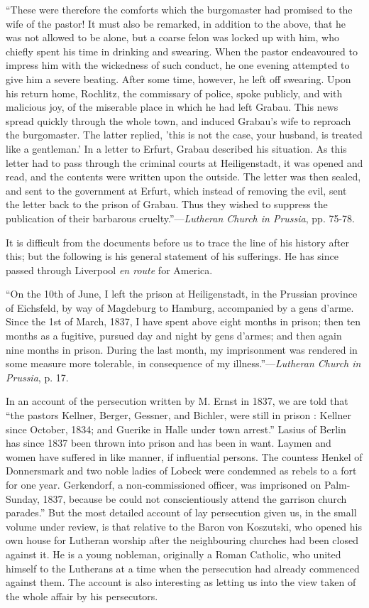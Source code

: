 ``These were therefore the comforts
which the burgomaster had promised to the wife of the pastor! It must
also be remarked, in addition to the above, that he was not allowed to
be alone, but a coarse felon was locked up with him, who chiefly spent
his time in drinking and swearing. When the pastor endeavoured to
impress him with the wickedness of such conduct, he one evening
attempted to give him a severe beating. After some time, however, he
left off swearing. Upon his return home, Rochlitz, the commissary of
police, spoke publicly, and with malicious joy, of the miserable place
in which he had left Grabau. This news spread quickly through the whole
town, and induced Grabau's wife to reproach the burgomaster. The latter
replied, 'this is not the case, your husband, is treated like a
gentleman.' In a letter to Erfurt, Grabau described his situation. As
this letter had to pass through the criminal courts at Heiligenstadt, it
was opened and read, and the contents were written upon the outside. The
letter was then sealed, and sent to the government at Erfurt, which
instead of removing the evil, sent the letter back to the prison of
Grabau. Thus they wished to suppress the publication of their barbarous
cruelty.''—\emph{Lutheran Church in Prussia}, pp. 75-78.

It is difficult from the documents before us to
trace the line of his history after this; but the following is his
general statement of his sufferings. He has since passed through
Liverpool \emph{en route} for America.

``On the 10th of June, I left the
prison at Heiligenstadt, in the Prussian province of Eichsfeld, by way
of Magdeburg to Hamburg, accompanied by a gens d'arme. Since the 1st of
March, 1837, I have spent above eight months in prison; then ten months
as a fugitive, pursued day and night by gens d'armes; and then again
nine months in prison. During the last month, my imprisonment was
rendered in some measure more tolerable, in consequence of my illness.''—\emph{Lutheran
Church in Prussia}, p. 17.

In an account of the persecution written by M.
Ernst in 1837, we are told that ``the pastors Kellner, Berger, Gessner,
and Bichler, were still in prison : Kellner since October, 1834; and
Guerike in Halle under town arrest.'' Lasius of Berlin has since 1837
been thrown into prison and has been in want. Laymen and women have
suffered in like manner, if influential persons. The countess Henkel of
Donnersmark and two noble ladies of Lobeck were condemned as rebels to a
fort for one year. Gerkendorf, a non-commissioned officer, was
imprisoned on Palm-Sunday, 1837, because be could not conscientiously
attend the garrison church parades.'' But the most detailed account of
lay persecution given us, in the small volume under review, is that
relative to the Baron von Koszutski, who opened his own house for
Lutheran worship after the neighbouring churches had been closed against
it. He is a young nobleman, originally a Roman Catholic, who united
himself to the Lutherans at a time when the persecution had already
commenced against them. The account is also interesting as letting us
into the view taken of the whole affair by his persecutors.

